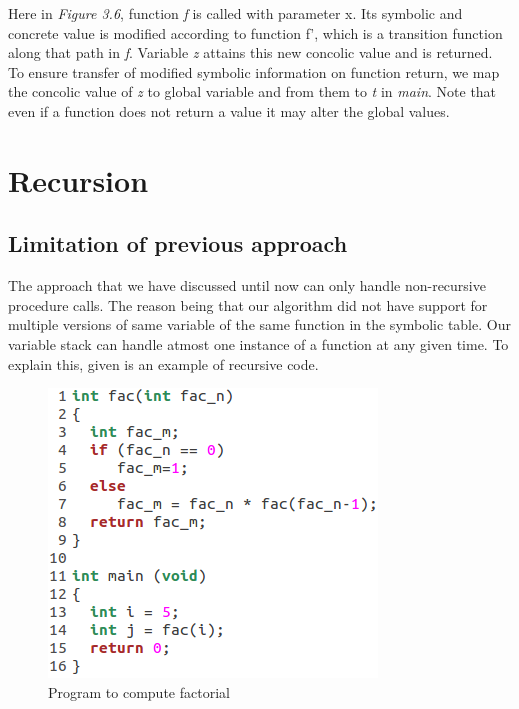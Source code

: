 \documentclass[12pt,oneside]{book}
\begin{document}
Here in \textit{Figure 3.6}, function \textit{f} is called with parameter x. Its symbolic and concrete value is modified according to function f', which is a transition function along that path in \textit{f}. Variable \textit{z} attains this new concolic value and is returned. To ensure transfer of modified symbolic information on function return, we map the concolic value of \textit{z} to global variable and from them to \textit{t} in \textit{main}. Note that even if a function does not return a value it may alter the global values.


\section{Recursion}
\subsection{Limitation of previous approach}
The approach that we have discussed until now can only handle non-recursive procedure calls. The reason being that our algorithm did not have support for multiple versions of same variable of the same function in the symbolic table. Our variable stack can handle atmost one instance of a function at any given time.
To explain this, given is an example of recursive code.

\vspace{0.4cm}
\begin{figure}[htbp]
\centering
\includegraphics[scale=0.60]{fac.png}
\caption{Program to compute factorial}
\end{figure}
\end{document}
